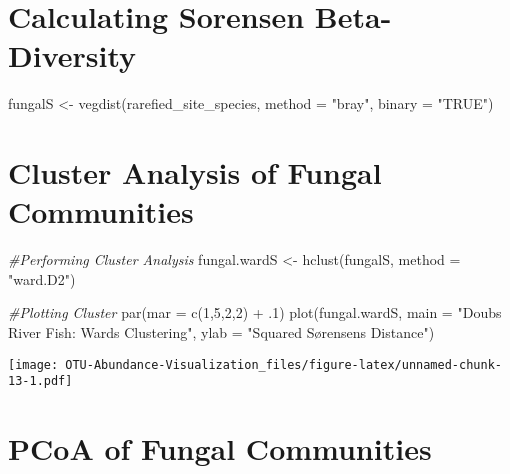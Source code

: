 \documentclass[
]{article}
\newenvironment{Shaded}{\begin{snugshade}}{\end{snugshade}}
\newcommand{\AttributeTok}[1]{\textcolor[rgb]{0.77,0.63,0.00}{#1}}
\newcommand{\CommentTok}[1]{\textcolor[rgb]{0.56,0.35,0.01}{\textit{#1}}}
\newcommand{\DecValTok}[1]{\textcolor[rgb]{0.00,0.00,0.81}{#1}}
\newcommand{\FunctionTok}[1]{\textcolor[rgb]{0.00,0.00,0.00}{#1}}
\newcommand{\NormalTok}[1]{#1}
\newcommand{\OtherTok}[1]{\textcolor[rgb]{0.56,0.35,0.01}{#1}}
\newcommand{\SpecialCharTok}[1]{\textcolor[rgb]{0.00,0.00,0.00}{#1}}
\newcommand{\StringTok}[1]{\textcolor[rgb]{0.31,0.60,0.02}{#1}}
\begin{document}
\hypertarget{calculating-sorensen-beta-diversity}{%
\section{Calculating Sorensen
Beta-Diversity}\label{calculating-sorensen-beta-diversity}}

\begin{Shaded}
\begin{Highlighting}[]
\NormalTok{fungalS }\OtherTok{\textless{}{-}} \FunctionTok{vegdist}\NormalTok{(rarefied\_site\_species, }\AttributeTok{method =} \StringTok{"bray"}\NormalTok{, }\AttributeTok{binary =} \StringTok{"TRUE"}\NormalTok{)}
\end{Highlighting}
\end{Shaded}

\hypertarget{cluster-analysis-of-fungal-communities-1}{%
\section{Cluster Analysis of Fungal
Communities}\label{cluster-analysis-of-fungal-communities-1}}

\begin{Shaded}
\begin{Highlighting}[]
\CommentTok{\#Performing Cluster Analysis}
\NormalTok{fungal.wardS }\OtherTok{\textless{}{-}} \FunctionTok{hclust}\NormalTok{(fungalS, }\AttributeTok{method =} \StringTok{"ward.D2"}\NormalTok{)}

\CommentTok{\#Plotting Cluster}
\FunctionTok{par}\NormalTok{(}\AttributeTok{mar =} \FunctionTok{c}\NormalTok{(}\DecValTok{1}\NormalTok{,}\DecValTok{5}\NormalTok{,}\DecValTok{2}\NormalTok{,}\DecValTok{2}\NormalTok{) }\SpecialCharTok{+}\NormalTok{ .}\DecValTok{1}\NormalTok{)}
\FunctionTok{plot}\NormalTok{(fungal.wardS, }\AttributeTok{main =} \StringTok{"Doubs River Fish: Ward\textquotesingle{}s Clustering"}\NormalTok{,}
     \AttributeTok{ylab =} \StringTok{"Squared Sørensen\textquotesingle{}s Distance"}\NormalTok{)}
\end{Highlighting}
\end{Shaded}

\texttt{[image: OTU-Abundance-Visualization\_files/figure-latex/unnamed-chunk-13-1.pdf]}

\hypertarget{pcoa-of-fungal-communities-1}{%
\section{PCoA of Fungal
Communities}\label{pcoa-of-fungal-communities-1}}
\end{document}
